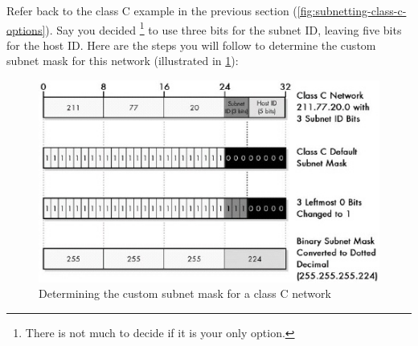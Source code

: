 Refer back to the class C example in the previous section (\vref{fig:subnetting-class-c-options}).
Say you decided%
   \footnote{There is not much to decide if it is your only option.}
to use three bits for the subnet ID, leaving five bits for the host ID.
Here are the steps you will follow to determine the custom subnet mask for this network (illustrated in \cref{fig:determining-custom-subnet-c}):


\begin{figure}
   \centering
   \includegraphics[width=.8\textwidth]{images/determining-custom-subnet-c.jpg}
   \caption{Determining the custom subnet mask for a class C network}
   \label{fig:determining-custom-subnet-c}
\end{figure}


